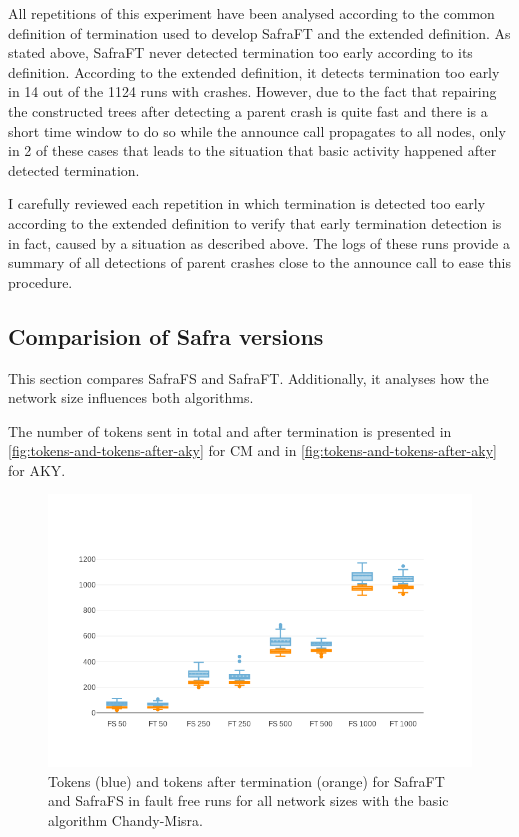 All repetitions of this experiment have been analysed according to the common definition of termination used to develop SafraFT and the extended definition.
As stated above, SafraFT never detected termination too early according to its definition.
According to the extended definition, it detects termination too early in 14 out of the 1124 runs with crashes.  %
However, due to the fact that repairing the constructed trees after detecting a parent crash is quite fast and there is a short time window to do so while the announce call propagates to all nodes, only in 2 of these cases that leads to the situation that basic activity happened after detected termination. %

I carefully reviewed each repetition in which termination is detected too early according to the extended definition to verify that early termination detection is in fact, caused by a situation as described above.
The logs of these runs provide a summary of all detections of parent crashes close to the announce call to ease this procedure.

\subsection{Comparision of Safra versions}
This section compares SafraFS and SafraFT.
Additionally, it analyses how the network size influences both algorithms.

The number of tokens sent in total and after termination is presented in \cref{fig:tokens-and-tokens-after-aky} for CM and in \cref{fig:tokens-and-tokens-after-aky} for AKY.

\begin{figure}
	\includegraphics{figures/tokens-cm.png}
	\caption{Tokens (blue) and tokens after termination (orange) for SafraFT and SafraFS in fault free runs for all network sizes with the basic algorithm Chandy-Misra.}
	\label{fig:tokens-and-tokens-after-cm}
\end{figure}

